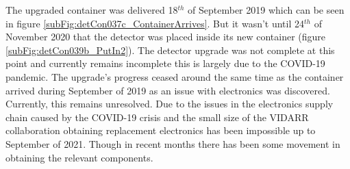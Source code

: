 The upgraded container was delivered 18$^{th}$ of September 2019 which can be seen in figure  \ref{subFig:detCon037c_ContainerArrives}. But it wasn't until 24$^{th}$ of November 2020 that the detector was placed inside its new container (figure \ref{subFig:detCon039b_PutIn2}). The detector upgrade was not complete at this point and currently remains incomplete this is largely due to the COVID-19 pandemic. The upgrade's progress ceased around the same time as the container arrived during September of 2019 as an issue with electronics was discovered. Currently, this remains unresolved. Due to the issues in the electronics supply chain caused by the COVID-19 crisis and the small size of the VIDARR collaboration obtaining replacement electronics has been impossible up to September of 2021. Though in recent months there has been some movement in obtaining the relevant components. 

